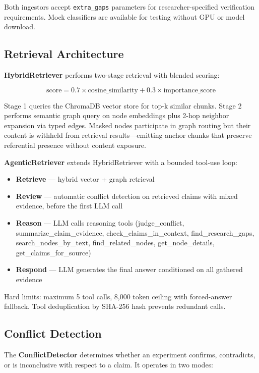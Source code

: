 \documentclass[letterpaper]{article}          %
\theoremstyle{plain}
\theoremstyle{definition}
\theoremstyle{remark}
\begin{document}
Both ingestors accept \texttt{extra\_gaps} parameters for researcher-specified
verification requirements. Mock classifiers are available for testing without
GPU or model download.

\subsection{Retrieval Architecture}

\textbf{HybridRetriever} performs two-stage retrieval with blended scoring:

\[
\text{score} = 0.7 \times \text{cosine\_similarity} + 0.3 \times \text{importance\_score}
\]

Stage 1 queries the ChromaDB vector store for top-k similar chunks. Stage 2
performs semantic graph query on node embeddings plus 2-hop neighbor expansion
via typed edges. Masked nodes participate in graph routing but their content is
withheld from retrieval results---emitting anchor chunks that preserve referential
presence without content exposure.

\textbf{AgenticRetriever} extends HybridRetriever with a bounded tool-use loop:

\begin{itemize}
    \item \textbf{Retrieve} --- hybrid vector + graph retrieval
    \item \textbf{Review} --- automatic conflict detection on retrieved claims
    with mixed evidence, before the first LLM call
    \item \textbf{Reason} --- LLM calls reasoning tools (judge\_conflict,
    summarize\_claim\_evidence, check\_claims\_in\_context, find\_research\_gaps,
    search\_nodes\_by\_text, find\_related\_nodes, get\_node\_details,
    get\_claims\_for\_source)
    \item \textbf{Respond} --- LLM generates the final answer conditioned on all
    gathered evidence
\end{itemize}

Hard limits: maximum 5 tool calls, 8,000 token ceiling with forced-answer
fallback. Tool deduplication by SHA-256 hash prevents redundant calls.

\subsection{Conflict Detection}

The \textbf{ConflictDetector} determines whether an experiment confirms,
contradicts, or is inconclusive with respect to a claim. It operates in two modes:
\end{document}
